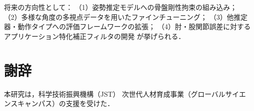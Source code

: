 \documentclass[twocolumn]{article}
\begin{document}
将来の方向性として：
（1）姿勢推定モデルへの骨盤剛性拘束の組み込み；
（2）多様な角度の多視点データを用いたファインチューニング；
（3）他推定器・動作タイプへの評価フレームワークの拡張；
（4）肘・股関節誤差に対するアプリケーション特化補正フィルタの開発
が挙げられる．

\section*{謝辞}

本研究は，科学技術振興機構（JST）
次世代人材育成事業（グローバルサイエンスキャンパス）の支援を受けた．

\end{document}
